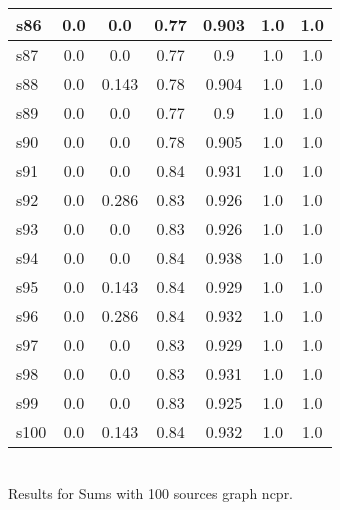 \documentclass{article}
\begin{document}
\begin{tabular}{|l|c|c|c|c|c|c|}
\hline
s86 &0.0 & 0.0 & 0.77 & 0.903 & 1.0 & 1.0\\
\hline
s87 &0.0 & 0.0 & 0.77 & 0.9 & 1.0 & 1.0\\
\hline
s88 &0.0 & 0.143 & 0.78 & 0.904 & 1.0 & 1.0\\
\hline
s89 &0.0 & 0.0 & 0.77 & 0.9 & 1.0 & 1.0\\
\hline
s90 &0.0 & 0.0 & 0.78 & 0.905 & 1.0 & 1.0\\
\hline
s91 &0.0 & 0.0 & 0.84 & 0.931 & 1.0 & 1.0\\
\hline
s92 &0.0 & 0.286 & 0.83 & 0.926 & 1.0 & 1.0\\
\hline
s93 &0.0 & 0.0 & 0.83 & 0.926 & 1.0 & 1.0\\
\hline
s94 &0.0 & 0.0 & 0.84 & 0.938 & 1.0 & 1.0\\
\hline
s95 &0.0 & 0.143 & 0.84 & 0.929 & 1.0 & 1.0\\
\hline
s96 &0.0 & 0.286 & 0.84 & 0.932 & 1.0 & 1.0\\
\hline
s97 &0.0 & 0.0 & 0.83 & 0.929 & 1.0 & 1.0\\
\hline
s98 &0.0 & 0.0 & 0.83 & 0.931 & 1.0 & 1.0\\
\hline
s99 &0.0 & 0.0 & 0.83 & 0.925 & 1.0 & 1.0\\
\hline
s100 &0.0 & 0.143 & 0.84 & 0.932 & 1.0 & 1.0\\
\hline
\end{tabular}\\

\noindent Results for Sums with 100 sources graph ncpr.
\end{document}
